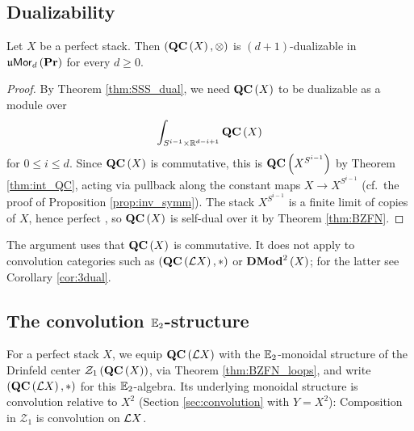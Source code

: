 \subsection{Dualizability}
\label{sec:QC_dualizability}

\begin{prop}
\label{prop:QC_dualizable}
Let $X$ be a perfect stack. Then $\left(\mathbf{QC}\left(X\right),\otimes\right)$ is
$\left(d+1\right)$-dualizable in $\mathfrak{u}\mathsf{Mor}_d\left(\mathbf{Pr}\right)$ for every $d\geq0$.
\end{prop}

\begin{proof}
By Theorem \ref{thm:SSS_dual}, we need $\mathbf{QC}\left(X\right)$ to be dualizable as a module over
\begin{equation*}
\int_{S^{i-1}\times\mathbb{R}^{d-i+1}}\mathbf{QC}\left(X\right)
\end{equation*}
for $0\leq i\leq d$. Since
$\mathbf{QC}\left(X\right)$ is commutative, this is $\mathbf{QC}\left(X^{S^{i-1}}\right)$ by Theorem
\ref{thm:int_QC}, acting via pullback along the constant maps $X\to X^{S^{i-1}}$ (cf.\ the
proof of Proposition \ref{prop:inv_symm}). The stack $X^{S^{i-1}}$ is a finite limit of copies
of $X$, hence perfect \cite[\S 3]{BZFN}, so $\mathbf{QC}\left(X\right)$ is self-dual over it by Theorem
\ref{thm:BZFN}.
\end{proof}

The argument uses that $\mathbf{QC}\left(X\right)$ is commutative. It does not apply to convolution
categories such as $\left(\mathbf{QC}\left(\mathcal{L} X\right),*\right)$ or $\mathbf{DMod}^2\left(X\right)$; for the
latter see Corollary \ref{cor:3dual}.

\subsection{The convolution \texorpdfstring{$\mathbb{E}_2$}{E2}-structure}
\label{sec:LX_convolution}

For a perfect stack $X$, we equip $\mathbf{QC}\left(\mathcal{L} X\right)$ with the $\mathbb{E}_2$-monoidal structure
of the Drinfeld center $\mathcal{Z}_1\left(\mathbf{QC}\left(X\right)\right)$, via Theorem
\ref{thm:BZFN_loops}, and write $\left(\mathbf{QC}\left(\mathcal{L} X\right),*\right)$ for this
$\mathbb{E}_2$-algebra. Its underlying monoidal structure is convolution relative to $X^2$ (Section
\ref{sec:convolution} with $Y=X^2$): Composition in $\mathcal{Z}_1$ is convolution on $\mathcal{L} X$.
